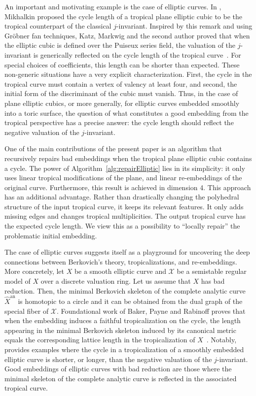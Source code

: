 \documentclass[11pt]{amsart}
\numberwithin{equation}{section}
\theoremstyle{plain}
\theoremstyle{definition}
\theoremstyle{remark}
\begin{document}
An important and motivating example is the case of elliptic curves. 
In \cite[Example 3.15]{Mi06}, Mikhalkin proposed the
cycle length of a tropical plane elliptic cubic to be the tropical
counterpart of the classical $j$-invariant.  Inspired by this remark and using
Gr\"obner fan techniques, Katz, Markwig and the second author proved
that when the elliptic cubic is defined over the Puiseux series field, the
valuation of the $j$-invariant is generically reflected on the cycle
length of the tropical curve~\cite{KMM07}. For special choices
of coefficients, this length can be shorter than expected. These
non-generic situations have a very explicit characterization. First,
the cycle in the tropical curve must contain a vertex of valency at least
four, and second, the initial form of the discriminant of the cubic
must vanish. Thus, in the case of plane  elliptic cubics, or more
generally, for elliptic curves embedded smoothly into a toric surface, 
the question of what constitutes a good embedding from the tropical
perspective has a precise answer: the cycle length should reflect the negative valuation of the $j$-invariant.

One of the main contributions of the present paper is an algorithm that
recursively repairs bad embeddings when the tropical plane elliptic 
cubic contains a cycle. The power of
Algorithm~\ref{alg:repairElliptic} lies in its simplicity: it only
uses linear tropical modifications of the plane, and linear
re-embeddings of the original curve. Furthermore, this result is achieved in dimension 4.  This approach has an additional
advantage. Rather than drastically changing the polyhedral structure
of the input tropical curve, it keeps its relevant features. It only
adds missing edges and changes tropical multiplicities. The output tropical
curve has the expected cycle length.  We view this as a possibility to
``locally repair'' the problematic initial embedding.

The case of elliptic curves suggests itself as a playground for
uncovering the deep connections between Berkovich's theory,
tropicalizations, and re-embeddings.  More concretely, let $X$ be a
smooth elliptic curve and $\mathscr{X}$ be a semistable regular model
of $X$ over a discrete valuation ring. Let us assume that $X$ has bad
reduction. Then, the minimal Berkovich skeleton of the complete
analytic curve $\widehat{X}^\operatorname{an}$ is homotopic to a circle and it can
be obtained from the dual graph of the special fiber of $\mathscr{X}$.
Foundational work of Baker, Payne and Rabinoff proves that when the
embedding induces a faithful tropicalization on the cycle, the length
appearing in the minimal Berkovich skeleton induced by its canonical
metric equals the corresponding lattice length in the tropicalization
of $X$~\cite[Section 6]{BPR11}.  Notably, \cite[Section 7]{BPR11}
provides examples where the cycle in a tropicalization of a smoothly
embedded elliptic curve is shorter, or longer, than the negative
valuation of the $j$-invariant. Good embeddings of elliptic curves
with bad reduction are those where the minimal skeleton of the
complete analytic curve is reflected in the associated tropical curve.
\end{document}
